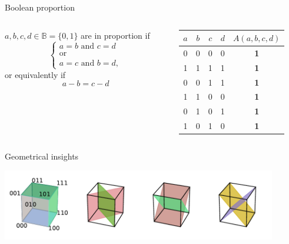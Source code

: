 \documentclass{beamer}
\begin{document}
\begin{frame}{Boolean proportion}
  \begin{columns}
    \begin{column}{0.4\textwidth}
  $a, b, c, d \in \mathbb{B} = \{0, 1\}$ are in proportion if
  $$
  \begin{cases}
    a = b \text{ and } c = d\\
    \text{or}\\
    a = c \text{ and } b = d,
  \end{cases}
  $$
  or equivalently if
  $$a - b = c - d$$
    \end{column}
    \begin{column}{0.4\textwidth}
  \begin{table}[t]
    \centering
    \begin{tabular}[t]{ccccc}
      \toprule
      $a$ & $b$ & $c$ & $d$ &  $A(a, b, c, d)$\\
      \midrule
      0 & 0 & 0 & 0 &   \textbf{1}\\
      1 & 1 & 1 & 1 &   \textbf{1}\\
      0 & 0 & 1 & 1 &   \textbf{1}\\
      1 & 1 & 0 & 0 &   \textbf{1}\\
      0 & 1 & 0 & 1 &   \textbf{1}\\
      1 & 0 & 1 & 0 &   \textbf{1}\\
      \bottomrule
    \end{tabular}
  \end{table}
    \end{column}
  \end{columns}
\end{frame}

\begin{frame}{Geometrical insights}
  \begin{center}
    \includegraphics[width=0.9\textwidth]{figures/cubes_in_B3.pdf}
  \end{center}
\end{frame}
\end{document}
